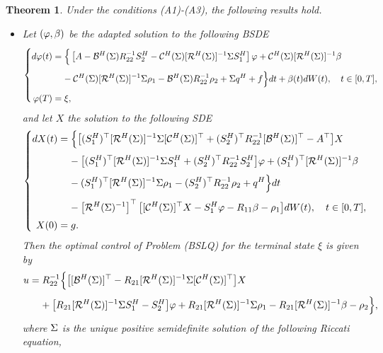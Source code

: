 \documentclass[11pt,times,twoside]{article}
\def\b{\beta}         \def\D{\Delta}   \def\d{\delta}   \def\F{\Phi}     \def\p{\phi}
\def\ba{\begin{aligned}}              \def\ea{\end{aligned}}
\newtheorem{theorem}{Theorem}[section]
\begin{document}
\begin{theorem}
Under the conditions (A1)-(A3), the following results hold.
\begin{itemize}
\item [(i)] Let $(\f,\b)$ be the adapted solution to the following BSDE
%
\begin{equation}\label{4.24}\left\{\ba
\ns\ds d\varphi(t) &= \Big\{ \left[A-\mathcal{B}^H(\Si) R_{22}^{-1} S_{2}^H-\mathcal{C}^H(\Si) [\mathcal{R}^H(\Si)]^{-1} \Si S_{1}^H\right] \varphi
+\cC^H(\Si) [\mathcal{R}^H(\Si)]^{-1} \beta \\
%
\ns\ds &\hp{=\ } -\cC^H(\Si) [\mathcal{R}^H(\Si)]^{-1}\Si\rho_1
-\cB^H(\Si) R_{22}^{-1}\rho_2+\Si q^H+f \Big\} d t+\beta(t) d W(t), \quad t \in[0, T], \\
%
\ns\ds \varphi(T) &= \xi,
\ea\right.\end{equation}
%
and let $X$ the solution to the following SDE
%
\begin{equation*}\left\{\begin{aligned}
\ds dX(t) &=\Big\{\big[(S_{1}^H)^{\top} [\cR^H(\Si)]^{-1} \Si [\cC^H(\Si)]^{\top}+(S_{2}^H)^{\top} R_{22}^{-1} [\cB^H(\Si)]^{\top}-A^{\top}\big] X\\
%
\ns\ds &\hp{=\ } -\big[(S_{1}^H)^{\top} [\cR^H(\Si)]^{-1}\Si S^H_{1}+(S_{2}^H)^{\top}R_{22}^{-1}S_{2}^H\big]\varphi
+(S_{1}^H)^{\top} [\cR^H(\Si)]^{-1} \beta\\
%
\ns\ds &\hp{=\ } -(S_{1}^H)^{\top} [\cR^H(\Si)]^{-1} \Si\rho_1-(S_{2}^H)^{\top} R_{22}^{-1}\rho_2+q^H \Big\} d t \\
%
\ns\ds &\hp{=\ } - \lt[\cR^H(\Si)^{-1}\rt]^{\top}\big[[\cC^H(\Si)]^{\top} X-S_{1}^H \varphi-R_{11} \beta -\rho_1\big] dW(t),\q t\in[0,T], \\
%
\ns\ds X(0)&= g .
\end{aligned}\right.
\end{equation*}
%
Then the optimal control of Problem (BSLQ) for the terminal state $\xi$ is given by
%
\begin{align*}
\ds u &= R_{22}^{-1}\Big\{\big[[\mathcal{B}^{H}(\Si)]^{\top}-R_{21} [\mathcal{R}^{H}(\Si)]^{-1} \Si [\mathcal{C}^{H}(\Si)]^{\top}\big] X\\
%
\ns\ds &\hp{=\ } +\big[R_{21} [\mathcal{R}^{H}(\Si)]^{-1} \Si S_{1}^{H}-S_{2}^{H}\big] \varphi
+R_{21} [\mathcal{R}^{H}(\Si)]^{-1}\Si\rho_1
-R_{21} [\mathcal{R}^{H}(\Si)]^{-1} \beta  -\rho_2 \Big\},
%
\end{align*}
%
where $\Sigma$ is the unique positive semidefinite solution of the following Riccati equation,

\end{itemize}
\end{theorem}
\end{document}
